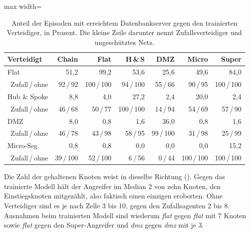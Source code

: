 \begin{table}[H]
  \centering
  \caption[Crown-Jewel-Quote in der Evaluation]{Anteil der Episoden mit
  erreichtem Datenbankserver gegen den trainierten Verteidiger, in Prozent.
  Die kleine Zeile darunter nennt Zufallsverteidiger und ungeschütztes
  Netz.}
  \label{tab:cj-eval}
  \footnotesize
  \setlength{\tabcolsep}{4pt}
  \begin{adjustbox}{max width=\textwidth}
  \begin{tabular}{l*{6}{r}}
    \toprule
    Verteidigt & Chain & Flat & H\,\&\,S & DMZ & Micro & Super \\
    \midrule
    Flat         & 51,2 & 99,2 & 53,6 & 25,6 & 49,6 & 84,0 \\
    \multicolumn{1}{r}{\scriptsize Zufall\,/\,ohne} & \scriptsize 92\,/\,92 & \scriptsize 100\,/\,100 & \scriptsize 94\,/\,100 & \scriptsize 55\,/\,66 & \scriptsize 90\,/\,95 & \scriptsize 100\,/\,100 \\[2pt]
    Hub \& Spoke & 8,8 & 4,0 & 27,2 & 2,4 & 20,0 & 2,4 \\
    \multicolumn{1}{r}{\scriptsize Zufall\,/\,ohne} & \scriptsize 46\,/\,68 & \scriptsize 50\,/\,77 & \scriptsize 100\,/\,100 & \scriptsize 14\,/\,94 & \scriptsize 54\,/\,69 & \scriptsize 57\,/\,90 \\[2pt]
    DMZ          & 8,0 & 0,8 & 1,6 & 36,0 & 0,8 & 1,6 \\
    \multicolumn{1}{r}{\scriptsize Zufall\,/\,ohne} & \scriptsize 46\,/\,78 & \scriptsize 43\,/\,98 & \scriptsize 58\,/\,95 & \scriptsize 99\,/\,100 & \scriptsize 31\,/\,98 & \scriptsize 25\,/\,99 \\[2pt]
    Micro-Seg.   & 0,8 & 0,8 & 0,0 & 0,0 & 0,0 & 15,2 \\
    \multicolumn{1}{r}{\scriptsize Zufall\,/\,ohne} & \scriptsize 39\,/\,100 & \scriptsize 52\,/\,100 & \scriptsize 6\,/\,56 & \scriptsize 0\,/\,44 & \scriptsize 100\,/\,100 & \scriptsize 100\,/\,100 \\[2pt]
    \bottomrule
  \end{tabular}
  \end{adjustbox}
\end{table}

Die Zahl der gehaltenen Knoten weist in dieselbe Richtung
(). Gegen das trainierte Modell hält der Angreifer im
Median 2 von zehn Knoten, den Einstiegsknoten mitgezählt, also faktisch
einen einzigen eroberten. Ohne Verteidiger sind es je nach Zelle 3 bis 10,
gegen den Zufallsagenten 2 bis 8. Ausnahmen beim trainierten Modell sind wiederum \emph{flat} gegen \emph{flat} mit 7
Knoten sowie \emph{flat} gegen den Super-Angreifer und \emph{dmz} gegen \emph{dmz} mit je 3.

